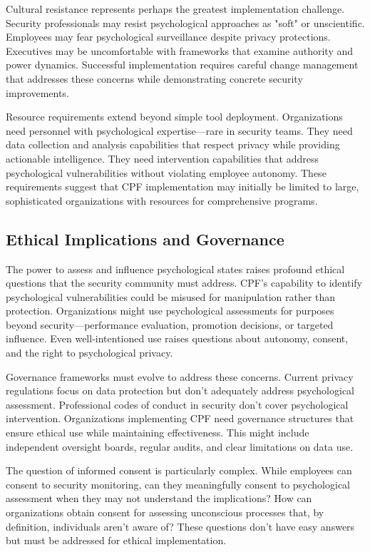 \documentclass[11pt,a4paper]{article}
\begin{document}
Cultural resistance represents perhaps the greatest implementation challenge. Security professionals may resist psychological approaches as "soft" or unscientific. Employees may fear psychological surveillance despite privacy protections. Executives may be uncomfortable with frameworks that examine authority and power dynamics. Successful implementation requires careful change management that addresses these concerns while demonstrating concrete security improvements.

Resource requirements extend beyond simple tool deployment. Organizations need personnel with psychological expertise—rare in security teams. They need data collection and analysis capabilities that respect privacy while providing actionable intelligence. They need intervention capabilities that address psychological vulnerabilities without violating employee autonomy. These requirements suggest that CPF implementation may initially be limited to large, sophisticated organizations with resources for comprehensive programs.

\subsection{Ethical Implications and Governance}

The power to assess and influence psychological states raises profound ethical questions that the security community must address. CPF's capability to identify psychological vulnerabilities could be misused for manipulation rather than protection. Organizations might use psychological assessments for purposes beyond security—performance evaluation, promotion decisions, or targeted influence. Even well-intentioned use raises questions about autonomy, consent, and the right to psychological privacy.

Governance frameworks must evolve to address these concerns. Current privacy regulations focus on data protection but don't adequately address psychological assessment. Professional codes of conduct in security don't cover psychological intervention. Organizations implementing CPF need governance structures that ensure ethical use while maintaining effectiveness. This might include independent oversight boards, regular audits, and clear limitations on data use.

The question of informed consent is particularly complex. While employees can consent to security monitoring, can they meaningfully consent to psychological assessment when they may not understand the implications? How can organizations obtain consent for assessing unconscious processes that, by definition, individuals aren't aware of? These questions don't have easy answers but must be addressed for ethical implementation.
\end{document}
